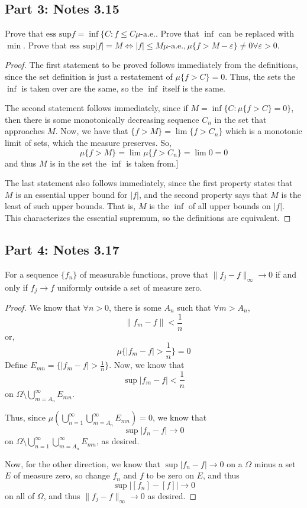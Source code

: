 \documentclass[fontsize=11pt]{scrartcl} %
\numberwithin{equation}{section} %
\numberwithin{figure}{section} %
\numberwithin{table}{section} %
\begin{document}
\subsection*{Part 3: Notes 3.15}
Prove that $\textrm{ess sup}f = \inf\{C : f \leq C \mu\textrm{-a.e.}$.
Prove that $\inf$ can be replaced with $\min$.
Prove that $\textrm{ess sup}|f| = M \iff |f|\leq M \mu\textrm{-a.e.}, \mu\{f
>M-\varepsilon\}\neq 0 \forall\varepsilon>0$.
\\
\begin{proof}
    The first statement to be proved follows immediately from the definitions,
    since the set definition is just a restatement of $\mu\{f>C\} = 0$. Thus,
    the sets the $\inf$ is taken over are the same, so the $\inf$ itself is the
    same.

    The second statement follows immediately, since if $M=\inf\{C:
    \mu\{f>C\}=0\}$, then there is some monotonically decreasing sequence $C_n$ in the set that
    approaches $M$. Now, we have that $\{f>M\} = \lim \{f>C_n\}$ which is a
    monotonic limit of sets, which the measure preserves. So,
    \[
        \mu\{f>M\} = \lim \mu\{f>C_n\} = \lim 0 = 0
    \]
    and thus $M$ is in the set the $\inf$ is taken from.]

    The last statement also follows immediately, since the first property states
    that $M$ is an essential upper bound for $|f|$, and the second property says
    that $M$ is the least of such upper bounds. That is, $M$ is the $\inf$ of
    all upper bounds on $|f|$. This characterizes the essential supremum, so the
    definitions are equivalent.
\end{proof}

\subsection*{Part 4: Notes 3.17}
For a sequence $\{f_n\}$ of measurable functions, prove that
$\|f_j-f\|_{\infty}\to0$ if and only if $f_j\to f$ uniformly outside a set of
measure zero.
\\
\begin{proof}
We know that $\forall n>0$, there is some $A_n$ such that $\forall m>A_n$,
    \[
        \|f_m-f\|<\frac{1}{n}
    \]
    or,
    \[
        \mu\{|f_m-f|>\frac{1}{n}\} = 0
    \]
    Define $E_{mn} = \{|f_m-f|>\frac{1}{n}\}$. Now, we know that
    \[
        \sup|f_m-f| <\frac{1}{n}
    \]
    on $\Omega\setminus \bigcup_{m=A_n}^{\infty}E_{mn}$.

    Thus, since $\mu (\bigcup_{n=1}^{\infty}\bigcup_{m=A_n}^{\infty}E_{mn}) =0$,
    we know that
    \[
        \sup|f_n-f|\to 0
    \]
    on $\Omega\setminus \bigcup_{n=1}^{\infty}\bigcup_{m=A_n}^{\infty}E_{mn}$,
    as desired.

    Now, for the other direction, we know that $\sup|f_n-f|\to 0$ on a $\Omega$
    minus a set $E$ of measure zero, so change $f_n$ and $f$ to be zero on $E$,
    and thus
    \[
        \sup|[f_n]-[f]| \to 0
    \]
    on all of $\Omega$, and thus $\|f_j-f\|_{\infty}\to 0$ as desired.
\end{proof}
\end{document}
